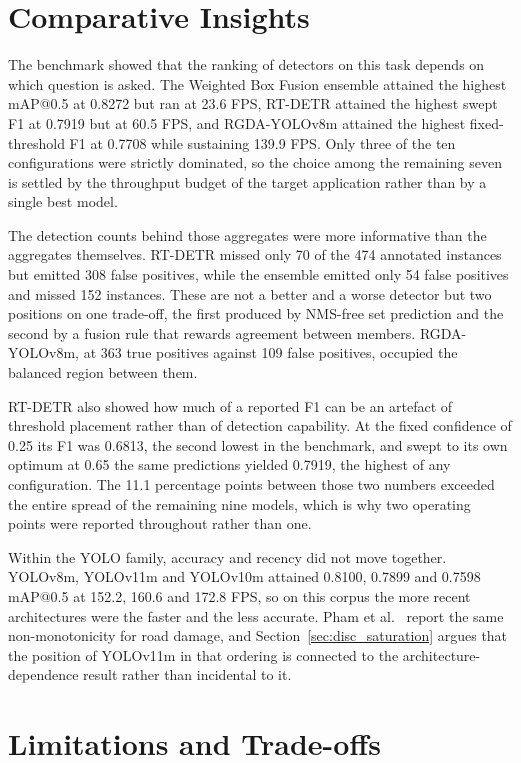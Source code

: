 \documentclass[MScCS]{uccthesis}
\begin{document}
\section{Comparative Insights}
\label{sec:conc_comparative}

The benchmark showed that the ranking of detectors on this task depends on which
question is asked. The Weighted Box Fusion ensemble attained the highest mAP@0.5
at 0.8272 but ran at 23.6 FPS, RT-DETR attained the highest swept F1 at 0.7919
but at 60.5 FPS, and RGDA-YOLOv8m attained the highest fixed-threshold F1 at
0.7708 while sustaining 139.9 FPS. Only three of the ten configurations were
strictly dominated, so the choice among the remaining seven is settled by the
throughput budget of the target application rather than by a single best model.

The detection counts behind those aggregates were more informative than the
aggregates themselves. RT-DETR missed only 70 of the 474 annotated instances but
emitted 308 false positives, while the ensemble emitted only 54 false positives
and missed 152 instances. These are not a better and a worse detector but two
positions on one trade-off, the first produced by NMS-free set prediction and the
second by a fusion rule that rewards agreement between members. RGDA-YOLOv8m, at
363 true positives against 109 false positives, occupied the balanced region
between them.

RT-DETR also showed how much of a reported F1 can be an artefact of threshold
placement rather than of detection capability. At the fixed confidence of 0.25 its
F1 was 0.6813, the second lowest in the benchmark, and swept to its own optimum at
0.65 the same predictions yielded 0.7919, the highest of any configuration. The
11.1 percentage points between those two numbers exceeded the entire spread of the
remaining nine models, which is why two operating points were reported throughout
rather than one.

Within the YOLO family, accuracy and recency did not move together. YOLOv8m,
YOLOv11m and YOLOv10m attained 0.8100, 0.7899 and 0.7598 mAP@0.5 at 152.2, 160.6
and 172.8 FPS, so on this corpus the more recent architectures were the faster and
the less accurate. Pham et al.~\parencite{pham2024optimizing} report the same
non-monotonicity for road damage, and Section~\ref{sec:disc_saturation} argues that
the position of YOLOv11m in that ordering is connected to the
architecture-dependence result rather than incidental to it.

\section{Limitations and Trade-offs}
\label{sec:conc_tradeoffs}
\end{document}
